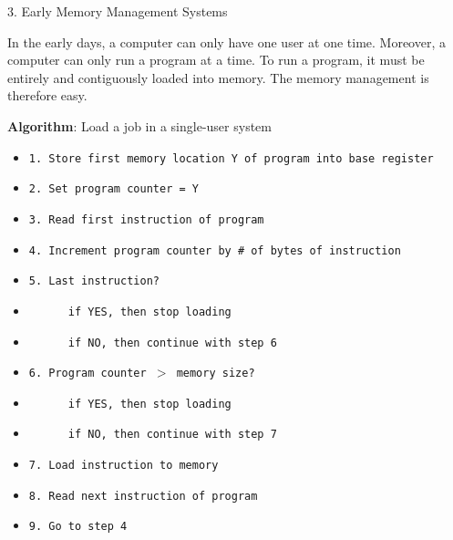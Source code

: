 \begin{slide}{ 3. Early Memory Management Systems}
\item In the early days, a computer can only have one user at one time.
Moreover, a computer can only run a program at a time.
To run a program, it must be entirely and contiguously loaded into memory.
The memory management is therefore easy.
\item {\bf Algorithm}: Load a job in a single-user system
 \begin{itemize}
 \item {\tt 1. Store first memory location Y of program into base register}
 \item {\tt 2. Set program counter = Y}
 \item {\tt 3. Read first instruction of program}
 \item {\tt 4. Increment program counter by \# of bytes of instruction}
 \item {\tt 5. Last instruction?}
 \item {\tt ~~~~~~if YES, then stop loading}
 \item {\tt ~~~~~~if NO, then continue with step 6}
 \item {\tt 6. Program counter $>$ memory size?}
 \item {\tt ~~~~~~if YES, then stop loading}
 \item {\tt ~~~~~~if NO, then continue with step 7}
 \item {\tt 7. Load instruction to memory}
 \item {\tt 8. Read next instruction of program}
 \item {\tt 9. Go to step 4}
 \end{itemize}
\end{slide}

